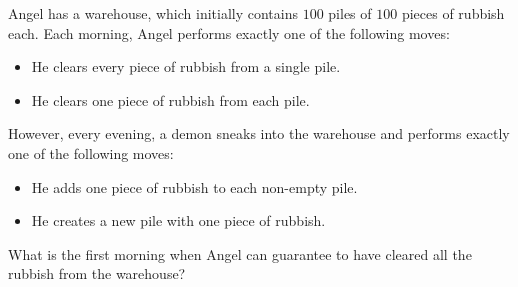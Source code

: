 Angel has a warehouse, which initially contains $100$ piles of $100$ pieces of rubbish each.
Each morning, Angel performs exactly one of the following moves:
\begin{itemize}
	\item He clears every piece of rubbish from a single pile.
	\item He clears one piece of rubbish from each pile.
\end{itemize}

However, every evening, a demon sneaks into the warehouse and performs exactly one of the following moves:
\begin{itemize}
	\item He adds one piece of rubbish to each non-empty pile.
	\item He creates a new pile with one piece of rubbish.
\end{itemize}

What is the first morning when Angel can guarantee to have cleared all the rubbish from the warehouse?

